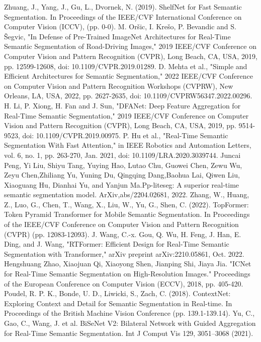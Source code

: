 \documentclass[11pt]{article}
\begin{document}
\begin{thebibliography}{99}
        Zhuang, J., Yang, J., Gu, L., Dvornek, N. (2019). ShelfNet for Fast Semantic Segmentation. In Proceedings of the IEEE/CVF International Conference on Computer Vision (ICCV), (pp. 0-0).
        M. Oršic, I. Krešo, P. Bevandic and S. Šegvic, "In Defense of Pre-Trained ImageNet Architectures for Real-Time Semantic Segmentation of Road-Driving Images," 2019 IEEE/CVF Conference on Computer Vision and Pattern Recognition (CVPR), Long Beach, CA, USA, 2019, pp. 12599-12608, doi: 10.1109/CVPR.2019.01289.
        D. Mehta et al., "Simple and Efficient Architectures for Semantic Segmentation," 2022 IEEE/CVF Conference on Computer Vision and Pattern Recognition Workshops (CVPRW), New Orleans, LA, USA, 2022, pp. 2627-2635, doi: 10.1109/CVPRW56347.2022.00296.
        H. Li, P. Xiong, H. Fan and J. Sun, "DFANet: Deep Feature Aggregation for Real-Time Semantic Segmentation," 2019 IEEE/CVF Conference on Computer Vision and Pattern Recognition (CVPR), Long Beach, CA, USA, 2019, pp. 9514-9523, doi: 10.1109/CVPR.2019.00975.
        P. Hu et al., "Real-Time Semantic Segmentation With Fast Attention," in IEEE Robotics and Automation Letters, vol. 6, no. 1, pp. 263-270, Jan. 2021, doi: 10.1109/LRA.2020.3039744.
         Juncai Peng, Yi Liu, Shiyu Tang, Yuying Hao, Lutao Chu, Guowei Chen, Zewu Wu, Zeyu Chen,Zhiliang Yu, Yuning Du, Qingqing Dang,Baohua Lai, Qiwen Liu, Xiaoguang Hu, Dianhai Yu, and Yanjun Ma.Pp-liteseg: A superior real-time semantic segmentation model. ArXiv,abs/2204.02681, 2022.
        Zhang, W., Huang, Z., Luo, G., Chen, T., Wang, X., Liu, W., Yu, G., Shen, C. (2022). TopFormer: Token Pyramid Transformer for Mobile Semantic Segmentation. In Proceedings of the IEEE/CVF Conference on Computer Vision and Pattern Recognition (CVPR) (pp. 12083-12093).
        J. Wang, C.-x. Gou, Q. Wu, H. Feng, J. Han, E. Ding, and J. Wang, "RTFormer: Efficient Design for Real-Time Semantic Segmentation with Transformer," arXiv preprint arXiv:2210.05861, Oct. 2022.
        Hengshuang Zhao, Xiaojuan Qi, Xiaoyong Shen, Jianping Shi, Jiaya Jia. "ICNet for Real-Time Semantic Segmentation on High-Resolution Images." Proceedings of the European Conference on Computer Vision (ECCV), 2018, pp. 405-420.
        Poudel, R. P. K., Bonde, U. D., Liwicki, S.,  Zach, C. (2018). ContextNet: Exploring Context and Detail for Semantic Segmentation in Real-time. In Proceedings of the British Machine Vision Conference (pp. 139.1-139.14).
        Yu, C., Gao, C., Wang, J. et al. BiSeNet V2: Bilateral Network with Guided Aggregation for Real-Time Semantic Segmentation. Int J Comput Vis 129, 3051–3068 (2021).

\end{thebibliography}
\end{document}
